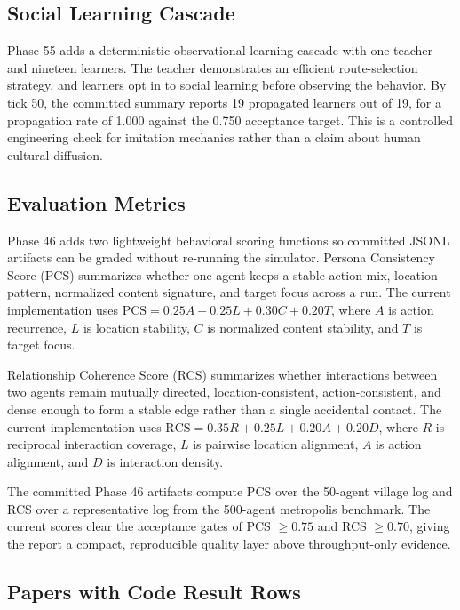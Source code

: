

\subsection{Social Learning Cascade}

Phase 55 adds a deterministic observational-learning cascade with one teacher and nineteen learners. The teacher demonstrates an efficient route-selection strategy, and learners opt in to social learning before observing the behavior. By tick 50, the committed summary reports 19 propagated learners out of 19, for a propagation rate of 1.000 against the 0.750 acceptance target. This is a controlled engineering check for imitation mechanics rather than a claim about human cultural diffusion.

\subsection{Evaluation Metrics}

Phase 46 adds two lightweight behavioral scoring functions so committed JSONL artifacts can be graded without re-running the simulator. Persona Consistency Score (PCS) summarizes whether one agent keeps a stable action mix, location pattern, normalized content signature, and target focus across a run. The current implementation uses
$\mathrm{PCS} = 0.25A + 0.25L + 0.30C + 0.20T$,
where $A$ is action recurrence, $L$ is location stability, $C$ is normalized content stability, and $T$ is target focus.

Relationship Coherence Score (RCS) summarizes whether interactions between two agents remain mutually directed, location-consistent, action-consistent, and dense enough to form a stable edge rather than a single accidental contact. The current implementation uses
$\mathrm{RCS} = 0.35R + 0.25L + 0.20A + 0.20D$,
where $R$ is reciprocal interaction coverage, $L$ is pairwise location alignment, $A$ is action alignment, and $D$ is interaction density.

The committed Phase 46 artifacts compute PCS over the 50-agent village log and RCS over a representative log from the 500-agent metropolis benchmark. The current scores clear the acceptance gates of PCS $\geq 0.75$ and RCS $\geq 0.70$, giving the report a compact, reproducible quality layer above throughput-only evidence.



\subsection{Papers with Code Result Rows}

